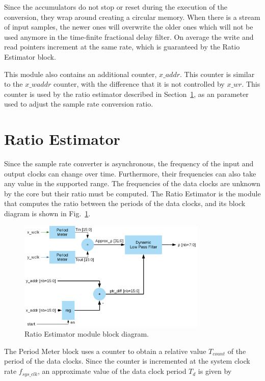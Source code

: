 Since the accumulators do not stop or reset during the execution of the
conversion, they wrap around creating a circular memory. When there is a stream
of input samples, the newer ones will overwrite the older ones which will not be
used anymore in the time-finite fractional delay filter.  On average the write
and read pointers increment at the same rate, which is guaranteed by the Ratio
Estimator block.

This module also contains an additional counter, $x\_addr$. This counter
is similar to the $x\_waddr$ counter, with the difference that it is
not controlled by $x\_wr$. This counter is used by the ratio estimator
described in Section~\ref{section:ratio_est}, as an parameter used
to adjust the sample rate conversion ratio.


\section{Ratio Estimator}
\label{section:ratio_est}

Since the sample rate converter is asynchronous, the frequency of the input and
output clocks can change over time. Furthermore, their frequencies can also take
any value in the supported range. The frequencies of the data clocks are unknown
by the core but their ratio must be computed. The Ratio Estimator is the module
that computes the ratio between the periods of the data clocks, and its block
diagram is shown in Fig.~\ref{fig:bd_ratioest}.

\begin{figure}[!htb]
  \centering
  \includegraphics[width=0.8\textwidth]{Figures/asrc_ratioest_bd.png}
  \caption{Ratio Estimator module block diagram.}
  \label{fig:bd_ratioest}
\end{figure}


The Period Meter block uses a counter to obtain a relative value $T_{count}$ of
the period of the data clocks. Since the counter is incremented at the system
clock rate $f_{sys\_clk}$, an approximate value of the data clock period $T_d$
is given by

